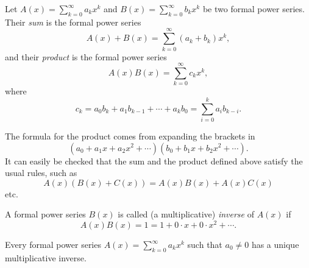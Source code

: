 \begin{page}
\setcounter{section}{2}
\setcounter{subsection}{2}
\setcounter{dfn}{1}
\label{portion:822}

\begin{dfn}
Let $A(x) = \sum_{k=0}^\infty a_k x^k$ and $B(x) = \sum_{k=0}^\infty b_k x^k$ be two formal power series.
Their \emph{sum} is the formal power series
\[
A(x) + B(x) = \sum_{k=0}^\infty (a_k + b_k)x^k,
\]
and their \emph{product} is the formal power series
\[
A(x)B(x) = \sum_{k=0}^\infty c_k x^k,
\]
where
\[
c_k = a_0b_k + a_1b_{k-1} + \cdots + a_kb_0 = \sum_{i=0}^k a_i b_{k-i}.
\]
\end{dfn}

\end{page}

\begin{page}
\setcounter{section}{2}
\setcounter{subsection}{2}
\setcounter{dfn}{1}
\label{portion:823}

The formula for the product comes from expanding the brackets in
\[
(a_0 + a_1 x + a_2 x^2 + \cdots)(b_0 + b_1 x + b_2 x^2 + \cdots).
\]
It can easily be checked that the sum and the product defined above satisfy the usual rules, such as
\[
A(x)(B(x) + C(x)) = A(x)B(x) + A(x)C(x)
\]
etc.


\end{page}

\begin{page}
\setcounter{section}{2}
\setcounter{subsection}{2}
\setcounter{dfn}{2}
\label{portion:825}

\begin{dfn}
A formal power series $B(x)$ is called (a multiplicative) \emph{inverse} of $A(x)$ if
\[
A(x)B(x) = 1 = 1 + 0 \cdot x + 0 \cdot x^2 + \cdots.
\]
\end{dfn}

\end{page}

\begin{page}
\setcounter{section}{2}
\setcounter{subsection}{2}
\setcounter{dfn}{3}
\label{portion:828}

\begin{lem}
\label{lem:MultInverse}
Every formal power series $A(x) = \sum_{k=0}^\infty a_k x^k$ such that $a_0 \ne 0$
has a unique multiplicative inverse.
\end{lem}

\end{page}

